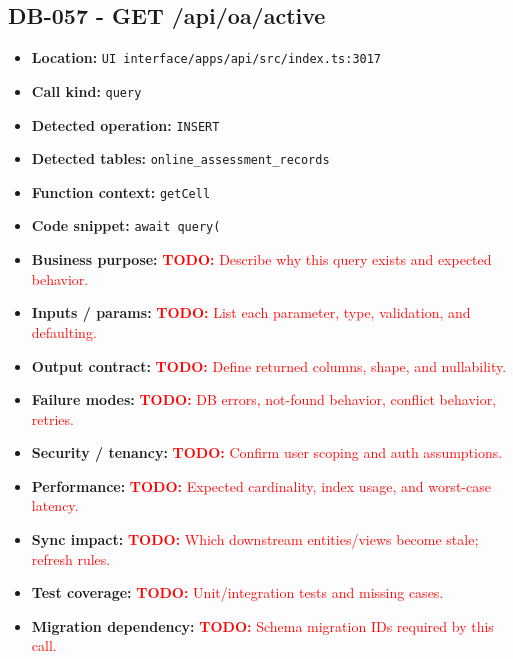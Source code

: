 \documentclass[11pt]{article}
\newcommand{\todoitem}[1]{\textcolor{red}{\textbf{TODO:} #1}}
\begin{document}
\subsection{DB-057 - GET /api/oa/active}
\begin{itemize}[leftmargin=1.5em]
\item \textbf{Location:} \texttt{UI interface/apps/api/src/index.ts:3017}
\item \textbf{Call kind:} \texttt{query}
\item \textbf{Detected operation:} \texttt{INSERT}
\item \textbf{Detected tables:} \texttt{online\_assessment\_records}
\item \textbf{Function context:} \texttt{getCell}
\item \textbf{Code snippet:} \texttt{await query(}
\item \textbf{Business purpose:} \todoitem{Describe why this query exists and expected behavior.}
\item \textbf{Inputs / params:} \todoitem{List each parameter, type, validation, and defaulting.}
\item \textbf{Output contract:} \todoitem{Define returned columns, shape, and nullability.}
\item \textbf{Failure modes:} \todoitem{DB errors, not-found behavior, conflict behavior, retries.}
\item \textbf{Security / tenancy:} \todoitem{Confirm user scoping and auth assumptions.}
\item \textbf{Performance:} \todoitem{Expected cardinality, index usage, and worst-case latency.}
\item \textbf{Sync impact:} \todoitem{Which downstream entities/views become stale; refresh rules.}
\item \textbf{Test coverage:} \todoitem{Unit/integration tests and missing cases.}
\item \textbf{Migration dependency:} \todoitem{Schema migration IDs required by this call.}
\end{itemize}
\end{document}
